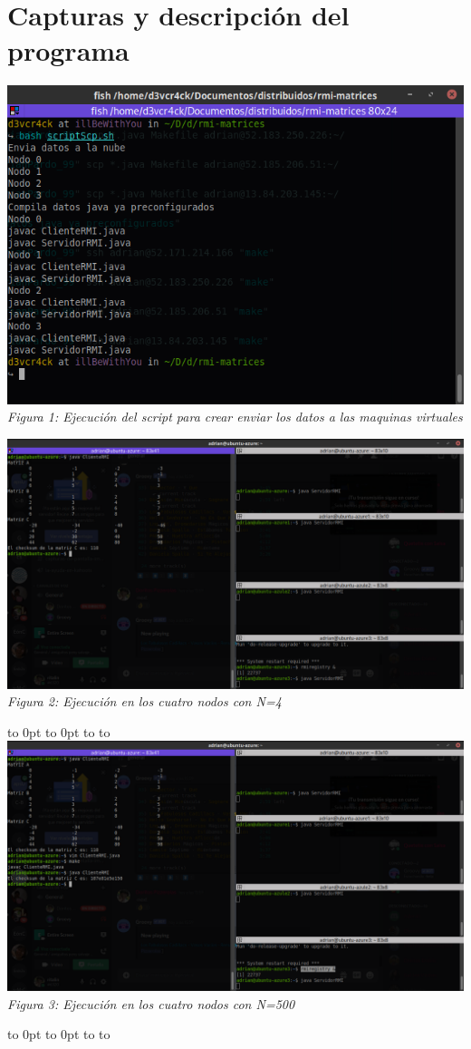 \documentclass[10pt,executivepaper]{article}
\def\fillandplacepagenumber{%
 \par\pagestyle{empty}%
 \vbox to 0pt{\vss}\vfill
 \vbox to 0pt{\baselineskip0pt
   \hbox to\linewidth{\hss}%
   \baselineskip\footskip
   \hbox to\linewidth{%
     \hfil\thepage\hfil}\vss}}
\begin{document}
\section{Capturas y descripción del programa}
\begin{center}
  \includegraphics[scale=0.5]{img/scripting-scp.png}
  \\\textit{Figura 1: Ejecución del script para crear enviar los datos a las maquinas virtuales}
  \\
  \begin{landscape}
    \includegraphics[scale=0.45]{img/ejecucion-N4.png}
    \\\textit{Figura 2: Ejecución en los cuatro nodos con N=4}
    \fillandplacepagenumber
    \includegraphics[scale=0.45]{img/ejecucion-N500}
    \\\textit{Figura 3: Ejecución en los cuatro nodos con N=500}
    \fillandplacepagenumber
  \end{landscape}

\end{center}
\end{document}
